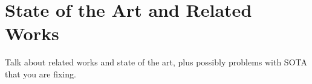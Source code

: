 \chapter{State of the Art and Related Works}\label{chap:sota}

Talk about related works and state of the art, plus possibly problems with
SOTA that you are fixing.
